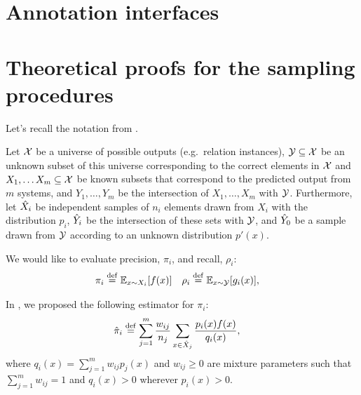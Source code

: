 \onecolumn
\section{Annotation interfaces}
\label{sec:interface}

\section{Theoretical proofs for the sampling procedures}
\label{app:sampling}

Let's recall the notation from .

Let $\mathcal{X}$ be a universe of possible outputs (e.g.\ relation instances),
  $\mathcal{Y} \subseteq \mathcal{X}$ be an unknown subset of this universe corresponding to the correct elements in $\mathcal{X}$ and
  $X_1, \ldots X_m \subseteq \mathcal{X}$ be known subsets that correspond to the predicted output from $m$ systems,
  and $Y_1, \ldots, Y_m$ be the intersection of $X_1, \ldots, X_m$ with $\mathcal{Y}$.
Furthermore, 
  let ${\hat{X}}_i$ be independent samples of $n_i$ elements drawn from $X_i$ with the distribution $p_i$,
  ${\hat{Y}}_i$ be the intersection of these sets with $\mathcal{Y}$, and
  ${\hat{Y}}_0$ be a sample drawn from $\mathcal{Y}$ according to an unknown distribution $p'(x)$.

We would like to evaluate precision, $\pi_i$, and recall, $\rho_i$:
\begin{align*}
  \pi_i  &\stackrel{\rm def}{=} \mathbb{E}_{x \sim X_i}[f(x)] &
  \rho_i &\stackrel{\rm def}{=} \mathbb{E}_{x \sim \mathcal{Y}}[g_i(x)],
\end{align*}

In , we proposed the following estimator for $\pi_i$:
\begin{align*}
  {\hat{\pi}}_i &\stackrel{\rm def}{=} \sum_{j=1}^m \frac{w_{ij}}{n_j} \sum_{x \in {\hat{X}}_j} \frac{p_i(x) f(x)}{q_i(x)},
\end{align*}
where $q_i(x) = \sum_{j=1}^m w_{ij} p_j(x)$ and $w_{ij} \ge 0$ are mixture parameters such that $\sum_{j=1}^m w_{ij} = 1$ and $q_i(x) > 0$ wherever $p_i(x) > 0$.

